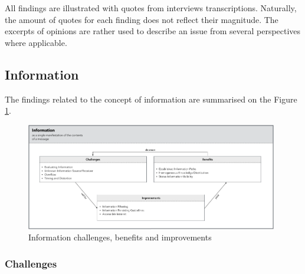 All findings are illustrated with quotes from interviews transcriptions. Naturally, the amount of quotes for each finding does not reflect their magnitude. The excerpts of opinions are rather used to describe an issue from several perspectives where applicable.

\subsection{Information}

The findings related to the concept of information are summarised on the Figure \ref{fig:information}.

\begin{figure}[h!]
  \centering
  \includegraphics[width=0.98\textwidth]{figures/information.png}
  \caption{Information challenges, benefits and improvements}
  \label{fig:information}
\end{figure}

\subsubsection{Challenges}

